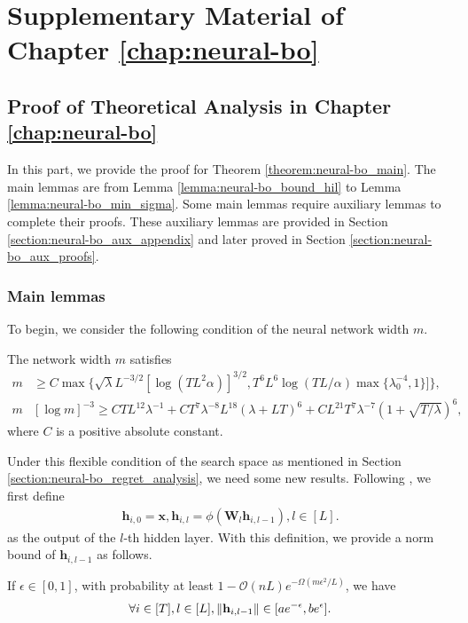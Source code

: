 \chapter{Supplementary Material of Chapter \ref{chap:neural-bo}} 
\label{section:neural-bo_supp}

\section{Proof of Theoretical Analysis in Chapter \ref{chap:neural-bo}}
\label{section:neural-bo_appendix}
In this part, we provide the proof for Theorem \ref{theorem:neural-bo_main}. The main lemmas are from Lemma \ref{lemma:neural-bo_bound_hil} to Lemma \ref{lemma:neural-bo_min_sigma}. Some main lemmas require auxiliary lemmas to complete their proofs. These auxiliary lemmas are provided in Section \ref{section:neural-bo_aux_appendix} and later proved in Section \ref{section:neural-bo_aux_proofs}. 
\subsection{Main lemmas}
To begin, we consider the following condition of the neural network width $m$.
\begin{condition}
\label{cond:set}
The network width $m$ satisfies
  \begin{align*}
     m & \geq C \max \Big\{ \sqrt{\lambda} L^{-3/2} [\log (TL^2 \alpha)]^{3/2}, T^6 L^6 \log (TL/ \alpha) \max \{\lambda_0^{-4},1 \} ] \Big\}, 
     \\
     m  & [\log m ]^{-3} \geq CTL^{12} \lambda^{-1} + CT^7 \lambda^{-8}L^{18}(\lambda + LT)^6 + CL^{21}T^7\lambda^{-7}(1 + \sqrt{T/ \lambda})^6,
    \end{align*} 
    where $C$ is a positive absolute constant.
\end{condition}
Under this flexible condition of the search space as mentioned in Section \ref{section:neural-bo_regret_analysis}, we need some new results. Following \citet{allen2019convergence}, we first define 
\begin{align*}
    \mathbf{h}_{i,0} = \mathbf{x}, \mathbf{h}_{i,l} = \phi(\mathbf{W}_l \mathbf{h}_{i, l-1}), l \in [L].
\end{align*}
as the output of the $l$-th hidden layer. With this definition, we provide a norm bound of $\mathbf{h}_{i, l-1}$ as follows.

\begin{lemma}
\label{lemma:neural-bo_bound_hil}
If $\epsilon \in [0,1]$,  with probability at least $1-\mathcal{O}(nL)e^{-\Omega(m\epsilon^2/L)}$, we have
\[ \forall i \in [T], l \in [L], \norm{\mathbf{h}_{i, l-1}} \in [ae^{-\epsilon}, be^\epsilon]. 
\]
\end{lemma}


